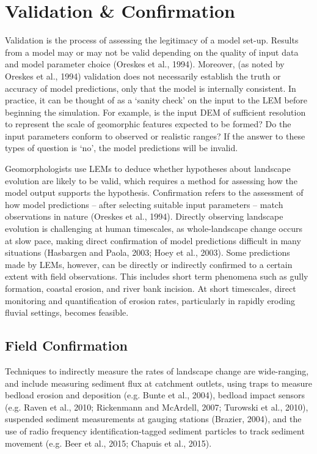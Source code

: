 \section{Validation \& Confirmation}
Validation is the process of assessing the legitimacy of a model set-up. Results from a model may or may not be valid depending on the quality of input data and model parameter choice (Oreskes et al., 1994). Moreover, (as noted by Oreskes et al., 1994) validation does not necessarily establish the truth or accuracy of model predictions, only that the model is internally consistent. In practice, it can be thought of as a ‘sanity check’ on the input to the LEM before beginning the simulation. For example, is the input DEM of sufficient resolution to represent the scale of geomorphic features expected to be formed? Do the input parameters conform to observed or realistic ranges? If the answer to these types of question is `no', the model predictions will be invalid. 

Geomorphologists use LEMs to deduce whether hypotheses about landscape evolution are likely to be valid, which requires a method for assessing how the model output supports the hypothesis. Confirmation refers to the assessment of how model predictions -- after selecting suitable input parameters -- match observations in nature (Oreskes et al., 1994). Directly observing landscape evolution is challenging at human timescales, as whole-landscape change occurs at slow pace, making direct confirmation of model predictions difficult in many situations (Hasbargen and Paola, 2003; Hoey et al., 2003). Some predictions made by LEMs, however, can be directly or indirectly confirmed to a certain extent with field observations. This includes short term phenomena such as gully formation, coastal erosion, and river bank incision. At short timescales, direct monitoring and quantification of erosion rates, particularly in rapidly eroding fluvial settings, becomes feasible. 

\subsection{Field Confirmation}
Techniques to indirectly measure the rates of landscape change are wide-ranging, and include measuring sediment flux at catchment outlets, using traps to measure bedload erosion and deposition (e.g. Bunte et al., 2004), bedload impact sensors (e.g. Raven et al., 2010; Rickenmann and McArdell, 2007; Turowski et al., 2010), suspended sediment measurements at gauging stations (Brazier, 2004), and the use of radio frequency identification-tagged sediment particles to track sediment movement (e.g. Beer et al., 2015; Chapuis et al., 2015).

